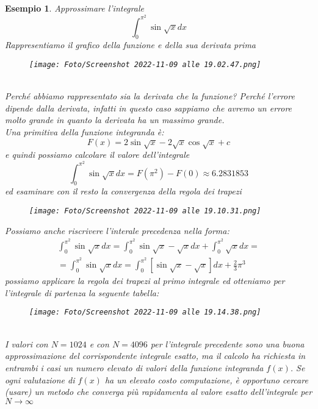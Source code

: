 \documentclass[a4paper, portrait]{book}
\numberwithin{equation}{chapter} %
\newtheorem{example}{Esempio}
\begin{document}
\newpage
\begin{example}
    Approssimare l'integrale
    \begin{equation}
        \int_0^{\pi^2} \sin \sqrt{x} dx 
   \end{equation}
    Rappresentiamo il grafico della funzione e della sua derivata prima
   \begin{figure}[h!]
        \centering
        \texttt{[image: Foto/Screenshot 2022-11-09 alle 19.02.47.png]}
        \caption{}
    \end{figure}
    \\Perché abbiamo rappresentato sia la derivata che la funzione? Perché l'errore dipende dalla derivata, infatti in questo caso sappiamo che avremo un errore molto grande in quanto la derivata ha un massimo grande.\\
    Una primitiva della funzione integranda è:
    \begin{equation}
        F(x) = 2\sin \sqrt{x} - 2 \sqrt{x}\cos \sqrt{x} + c
    \end{equation}
    e quindi possiamo calcolare il valore dell'integrale 
    \begin{equation}
        \int_0^{\pi^2} \sin \sqrt{x} dx = F(\pi^2) - F(0) \approx 6.2831853
    \end{equation}
    ed esaminare con il resto la convergenza della regola dei trapezi
    \begin{figure}[h!]
        \centering
        \texttt{[image: Foto/Screenshot 2022-11-09 alle 19.10.31.png]}
        \caption{}
    \end{figure}
    Possiamo anche riscrivere l'interale precedenza nella forma:
    \begin{gather}
        \int_0^{\pi^2} \sin \sqrt{x} dx = \int_0^{\pi^2} \sin \sqrt{x} - \sqrt{x} dx + \int_0^{\pi^2} \sqrt{x} dx = \\
        = \int_0^{\pi^2} \sin \sqrt{x} dx = \int_0^{\pi^2} [\sin \sqrt{x} - \sqrt{x}] dx + \frac{2}{3} \pi^3
    \end{gather}
    possiamo applicare la regola dei trapezi al primo integrale ed otteniamo per l'integrale di partenza la seguente tabella:
    \begin{figure}[h!]
        \centering
        \texttt{[image: Foto/Screenshot 2022-11-09 alle 19.14.38.png]}
        \caption{}
    \end{figure}
    \\I valori con $N = 1024$ e con $N = 4096$ per l'integrale precedente sono una buona approssimazione del corrispondente integrale esatto, ma il calcolo ha richiesta in entrambi i casi un numero elevato di valori della funzione integranda $f(x)$. Se ogni valutazione di $f(x)$ ha un elevato costo computazione, è opportuno cercare (usare) un metodo che converga più rapidamenta al valore esatto dell'integrale per $N \rightarrow \infty$
\end{example}
\end{document}
